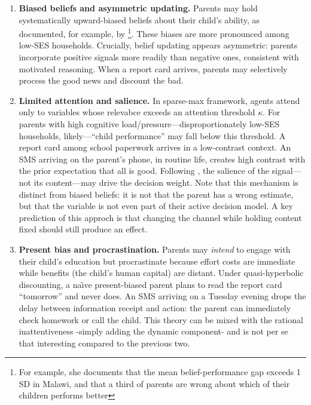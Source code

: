 \documentclass[11pt]{article}
\begin{document}
\begin{enumerate}
    \item \textbf{Biased beliefs and asymmetric updating.} Parents may hold systematically upward-biased beliefs about their child's ability, as documented, for example, by \citet{dizonross2019parents}\footnote{For example, she documents that the mean belief-performance gap exceeds 1 SD in Malawi, and that a third of parents are wrong about which of their children performs better }. These biases are more pronounced among low-SES households. Crucially, belief updating appears asymmetric: parents incorporate positive signals more readily than negative ones, consistent with motivated reasoning. When a report card arrives, parents may selectively process the good news and discount the bad. 

    \item \textbf{Limited attention and salience.} In \citet{gabaix2014sparsity} sparse-max framework, agents attend only to variables whose relevabce exceeds an attention threshold $\kappa$. For parents with high cognitive load/pressure---disproportionately low-SES households, likely---``child performance'' may fall below this threshold. A report card among school paperwork arrives in a low-contrast context. An SMS arriving on the parent's phone, in routine life, creates high contrast with the prior expectation that all is good. Following \citet{bordalo2012salience}, the salience of the signal---not its content---may drive the decision weight. Note that this mechanism is distinct from biased beliefs: it is not that the parent has a wrong estimate, but that the variable is not even part of their active decision model. A key prediction of this approch is that changing the channel while holding content fixed should still produce an effect.

    \item \textbf{Present bias and procrastination.} Parents may \emph{intend} to engage with their child's education but procrastinate because effort costs are immediate while benefits (the child's human capital) are distant. Under quasi-hyperbolic discounting, a na\"{\i}ve present-biased parent plans to read the report card ``tomorrow'' and never does. An SMS arriving on a Tuesday evening drops the delay between information receipt and action: the parent can immediately check homework or call the child. This theory can be mixed with the rational inattentiveness -simply adding the dynamic component- and is not per se that interesting compared to the previous two. 
\end{enumerate}
\end{document}
